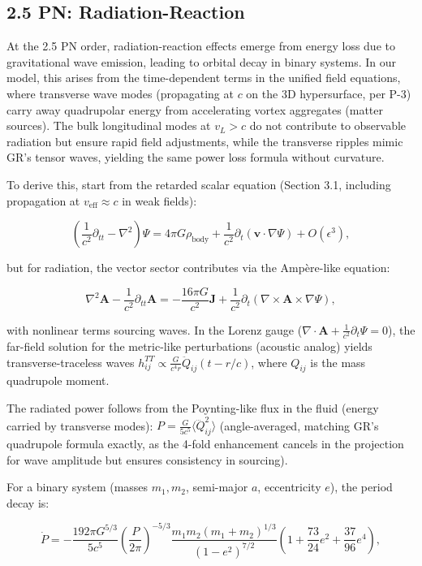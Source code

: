 \documentclass{article}
\begin{document}
\subsection{2.5 PN: Radiation-Reaction}

At the 2.5 PN order, radiation-reaction effects emerge from energy loss due to gravitational wave emission, leading to orbital decay in binary systems. In our model, this arises from the time-dependent terms in the unified field equations, where transverse wave modes (propagating at $c$ on the 3D hypersurface, per P-3) carry away quadrupolar energy from accelerating vortex aggregates (matter sources). The bulk longitudinal modes at $v_L > c$ do not contribute to observable radiation but ensure rapid field adjustments, while the transverse ripples mimic GR's tensor waves, yielding the same power loss formula without curvature.

To derive this, start from the retarded scalar equation (Section 3.1, including propagation at $v_{\text{eff}} \approx c$ in weak fields):

\[
\left( \frac{1}{c^2} \partial_{tt} - \nabla^2 \right) \Psi = 4\pi G \rho_{\text{body}} + \frac{1}{c^2} \partial_t (\mathbf{v} \cdot \nabla \Psi) + O(\epsilon^3),
\]

but for radiation, the vector sector contributes via the Ampère-like equation:

\[
\nabla^2 \mathbf{A} - \frac{1}{c^2} \partial_{tt} \mathbf{A} = -\frac{16\pi G}{c^2} \mathbf{J} + \frac{1}{c^2} \partial_t (\nabla \times \mathbf{A} \times \nabla \Psi),
\]

with nonlinear terms sourcing waves. In the Lorenz gauge ($\nabla \cdot \mathbf{A} + \frac{1}{c^2} \partial_t \Psi = 0$), the far-field solution for the metric-like perturbations (acoustic analog) yields transverse-traceless waves $h_{ij}^{TT} \propto \frac{G}{c^4 r} \ddot{Q}_{ij}(t - r/c)$, where $Q_{ij}$ is the mass quadrupole moment.

The radiated power follows from the Poynting-like flux in the fluid (energy carried by transverse modes): $P = \frac{G}{5 c^5} \langle \dddot{Q}_{ij}^2 \rangle$ (angle-averaged, matching GR's quadrupole formula exactly, as the 4-fold enhancement cancels in the projection for wave amplitude but ensures consistency in sourcing).

For a binary system (masses $m_1, m_2$, semi-major $a$, eccentricity $e$), the period decay is:

\[
\dot{P} = -\frac{192\pi G^{5/3}}{5 c^5} \left( \frac{P}{2\pi} \right)^{-5/3} \frac{m_1 m_2 (m_1 + m_2)^{1/3}}{(1 - e^2)^{7/2}} \left(1 + \frac{73}{24} e^2 + \frac{37}{96} e^4 \right),
\]
\end{document}
